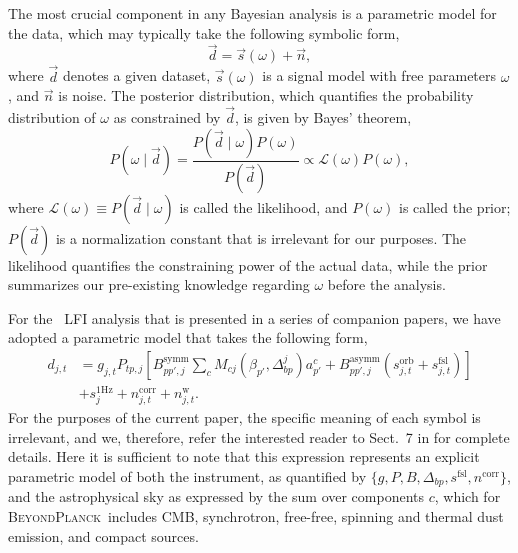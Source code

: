 \documentclass[twocolumn]{openjournal}
\renewcommand{\d}[0]{\vec{d}}
\newcommand{\n}[0]{\vec{n}}
\newcommand{\s}[0]{\vec{s}}
\newcommand{\BP}{\textsc{BeyondPlanck}}
\begin{document}
The most crucial component in any Bayesian analysis is a parametric model for
the data, which may typically take the following symbolic form,
\begin{equation}
\d = \s(\omega) + \n,
\end{equation}
where $\d$ denotes a given dataset, $\s(\omega)$ is a signal model
with free parameters $\omega$, and $\n$ is noise. The posterior
distribution, which quantifies the probability distribution of
$\omega$ as constrained by $\d$, is given by Bayes' theorem,
\begin{equation}
  P(\omega\mid \d) = \frac{P(\d\mid \omega)P(\omega)}{P(\d)} \propto
  \mathcal{L}(\omega)P(\omega),
  \label{eq:jointpost}
\end{equation}
where $\mathcal{L}(\omega)\equiv P(\d\mid \omega)$ is called the
likelihood, and $P(\omega)$ is called the prior; $P(\d)$ is a
normalization constant that is irrelevant for our purposes. The
likelihood quantifies the constraining power of the actual data, while
the prior summarizes our pre-existing knowledge regarding $\omega$
before the analysis.

For the \Planck\ LFI analysis that is presented in a series of
companion papers, we have adopted a parametric model that takes the
following form,
\begin{equation}
  \begin{split}
    d_{j,t} & = g_{j,t}P_{tp,j}\left[B^{\mathrm{symm}}_{pp',j}\sum_{c}
      M_{cj}(\beta_{p'}, \Delta_{bp}^{j})a^c_{p'}  + B^{\mathrm{asymm}}_{pp',j}\left(s^{\mathrm{orb}}_{j,t}  
      + s^{\mathrm{fsl}}_{j,t}\right)\right] \\
    & + s^{\mathrm{1\mathrm{Hz}}}_{j} + 
    n^{\mathrm{corr}}_{j,t} + n^{\mathrm{w}}_{j,t}.
  \end{split}
  \label{eq:todmodel}
\end{equation}
For the purposes of the current paper, the specific meaning of each symbol is
irrelevant, and we, therefore, refer the interested reader to Sect.~7 in
\citet{bp01} for complete details. Here it is sufficient to note that this
expression represents an explicit parametric model of both the instrument, as
quantified by $\{g, P, B, \Delta_{bp}, s^{\mathrm{fsl}}, n^{\mathrm{corr}}\}$,
and the astrophysical sky as expressed by the sum over components $c$, which
for \BP\ includes CMB, synchrotron, free-free, spinning and thermal dust
emission, and compact sources.
\end{document}
